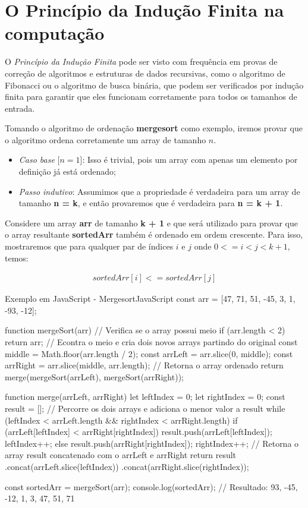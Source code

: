 \section{O Princípio da Indução Finita na computação}

O \emph{Princípio da Indução Finita} pode ser visto com frequência em provas de correção de algoritmos e estruturas de dados recursivas, como o algoritmo de Fibonacci ou o algoritmo de busca binária, que podem ser verificados por indução finita para garantir que eles funcionam corretamente para todos os tamanhos de entrada.

Tomando o algoritmo de ordenação \textbf{mergesort} como exemplo, iremos provar que o algoritmo ordena corretamente um array de tamanho $n$.

\begin{itemize}
    \item \emph{Caso base} [$n = 1$]: Isso é trivial, pois um array com apenas um elemento por definição já está ordenado;
    
    \item \emph{Passo indutivo}: Assumimos que a propriedade é verdadeira para um array de tamanho \textbf{n = k}, e então provaremos que é verdadeira para \textbf{n = k + 1}.
\end{itemize}

Considere um array \textbf{arr} de tamanho \textbf{k + 1} e que será utilizado para provar que o array resultante \textbf{sortedArr} também é ordenado em ordem crescente. Para isso, mostraremos que para qualquer par de índices $i$ e $j$ onde $0 <= i < j < k+1$, temos:

\begin{align*}
    sortedArr[i] <= sortedArr[j]
\end{align*}

\begin{codesnip}{Exemplo em JavaScript - Mergesort}{JavaScript}
const arr = [47, 71, 51, -45, 3, 1, -93, -12];

function mergeSort(arr) {
    // Verifica se o array possui meio
    if (arr.length < 2) return arr;
    // Econtra o meio e cria dois novos arrays partindo do original
    const middle = Math.floor(arr.length / 2);
    const arrLeft = arr.slice(0, middle);
    const arrRight = arr.slice(middle, arr.length);
    // Retorna o array ordenado
    return merge(mergeSort(arrLeft), mergeSort(arrRight));
}

function merge(arrLeft, arrRight) {
    let leftIndex = 0;
    let rightIndex = 0;
    const result = [];
    // Percorre os dois arrays e adiciona o menor valor a result
    while (leftIndex < arrLeft.length && 
            rightIndex < arrRight.length) {
    if (arrLeft[leftIndex] < arrRight[rightIndex]) {
        result.push(arrLeft[leftIndex]);
        leftIndex++;
    } else {
        result.push(arrRight[rightIndex]);
        rightIndex++;
        }
    }
    // Retorna o array result concatenado com o arrLeft e arrRight
    return result
    .concat(arrLeft.slice(leftIndex))
    .concat(arrRight.slice(rightIndex));
}

const sortedArr = mergeSort(arr);
console.log(sortedArr);    
// Resultado: 93, -45, -12, 1, 3, 47, 51, 71
\end{codesnip}

